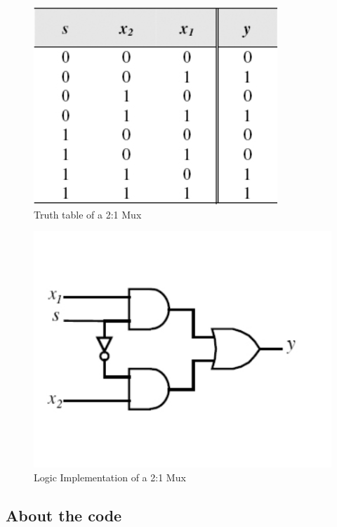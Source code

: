 \begin{figure}[H]
  \begin{centering}
  \includegraphics[scale=1]{data/muxtable.png}
  \par\end{centering}
  \caption{Truth table of a 2:1 Mux}
\end{figure}

\begin{figure}[H]
  \begin{centering}
  \includegraphics[scale=1]{data/muxlogic.png}
  \par\end{centering}
  \caption{Logic Implementation of a 2:1 Mux}
\end{figure}


\subsection*{About the code}

